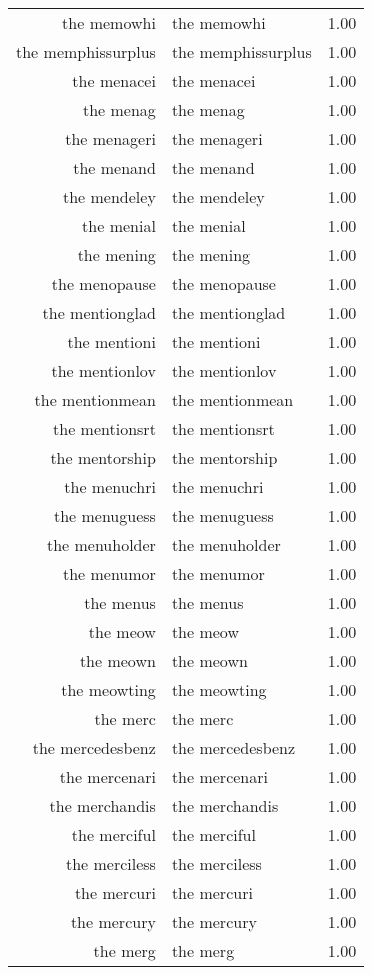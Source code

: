 \begin{table}[ht]
\begin{tabular}{rlr}
  the memowhi & the memowhi & 1.00 \\ 
  the memphissurplus & the memphissurplus & 1.00 \\ 
  the menacei & the menacei & 1.00 \\ 
  the menag & the menag & 1.00 \\ 
  the menageri & the menageri & 1.00 \\ 
  the menand & the menand & 1.00 \\ 
  the mendeley & the mendeley & 1.00 \\ 
  the menial & the menial & 1.00 \\ 
  the mening & the mening & 1.00 \\ 
  the menopause & the menopause & 1.00 \\ 
  the mentionglad & the mentionglad & 1.00 \\ 
  the mentioni & the mentioni & 1.00 \\ 
  the mentionlov & the mentionlov & 1.00 \\ 
  the mentionmean & the mentionmean & 1.00 \\ 
  the mentionsrt & the mentionsrt & 1.00 \\ 
  the mentorship & the mentorship & 1.00 \\ 
  the menuchri & the menuchri & 1.00 \\ 
  the menuguess & the menuguess & 1.00 \\ 
  the menuholder & the menuholder & 1.00 \\ 
  the menumor & the menumor & 1.00 \\ 
  the menus & the menus & 1.00 \\ 
  the meow & the meow & 1.00 \\ 
  the meown & the meown & 1.00 \\ 
  the meowting & the meowting & 1.00 \\ 
  the merc & the merc & 1.00 \\ 
  the mercedesbenz & the mercedesbenz & 1.00 \\ 
  the mercenari & the mercenari & 1.00 \\ 
  the merchandis & the merchandis & 1.00 \\ 
  the merciful & the merciful & 1.00 \\ 
  the merciless & the merciless & 1.00 \\ 
  the mercuri & the mercuri & 1.00 \\ 
  the mercury & the mercury & 1.00 \\ 
  the merg & the merg & 1.00 \\ 

\end{tabular}
\end{table}
